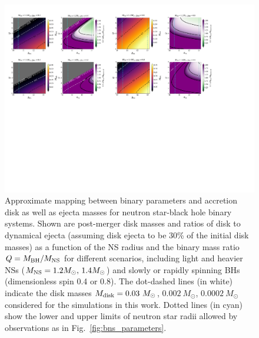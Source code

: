 \begin{landscape}
\begin{figure}[t]
  \centering
  \includegraphics[width=22cm]{figures/kilonova/NSBH_parameters_plot.pdf}
 \caption{Approximate mapping between binary parameters and accretion disk as well as ejecta masses for neutron star-black hole binary systems. Shown are post-merger disk masses and ratios of disk to dynamical ejecta (assuming disk ejecta to be 30\% of the initial disk masses) as a function of the NS radius and the binary mass ratio $Q = M_{\rm BH}/M_{\rm NS}$ for different scenarios, including light and heavier NSs ($M_{\rm NS} = 1.2M_\odot,\, 1.4M_\odot$) and slowly or rapidly spinning BHs (dimensionless spin 0.4 or 0.8). The dot-dashed lines (in white) indicate the disk masses $M_{\rm disk} = 0.03~M_\odot$, $0.002~M_\odot$, $0.0002~M_\odot$ considered for the simulations in this work. Dotted lines (in cyan) show the lower and upper limits of neutron star radii allowed by observations as in Fig.~\ref{fig:bns_parameters}.\label{fig:nsbh_parameters}}
\vspace{5mm}
\end{figure}
\end{landscape}

